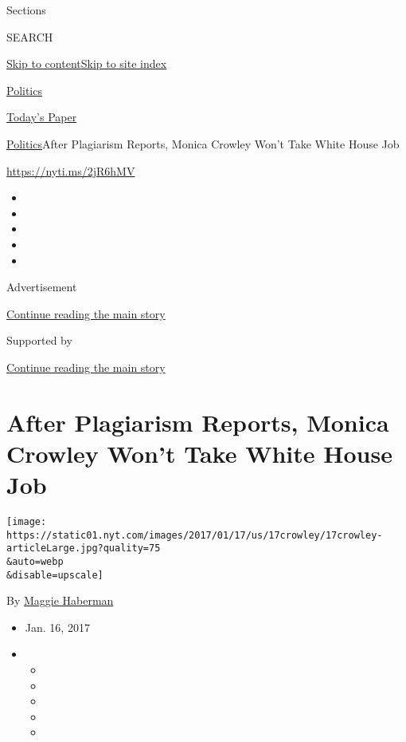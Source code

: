 Sections

SEARCH

\protect\hyperlink{site-content}{Skip to
content}\protect\hyperlink{site-index}{Skip to site index}

\href{https://www.nytimes.com/section/politics}{Politics}

\href{https://myaccount.nytimes.com/auth/login?response_type=cookie\&client_id=vi}{}

\href{https://www.nytimes.com/section/todayspaper}{Today's Paper}

\href{/section/politics}{Politics}\textbar{}After Plagiarism Reports,
Monica Crowley Won't Take White House Job

\url{https://nyti.ms/2jR6hMV}

\begin{itemize}
\item
\item
\item
\item
\item
\end{itemize}

Advertisement

\protect\hyperlink{after-top}{Continue reading the main story}

Supported by

\protect\hyperlink{after-sponsor}{Continue reading the main story}

\hypertarget{after-plagiarism-reports-monica-crowley-wont-take-white-house-job}{%
\section{After Plagiarism Reports, Monica Crowley Won't Take White House
Job}\label{after-plagiarism-reports-monica-crowley-wont-take-white-house-job}}

\texttt{[image: https://static01.nyt.com/images/2017/01/17/us/17crowley/17crowley-articleLarge.jpg?quality=75\\\&auto=webp\\\&disable=upscale]}

By \href{http://www.nytimes.com/by/maggie-haberman}{Maggie Haberman}

\begin{itemize}
\item
  Jan. 16, 2017
\item
  \begin{itemize}
  \item
  \item
  \item
  \item
  \item
  \end{itemize}
\end{itemize}

